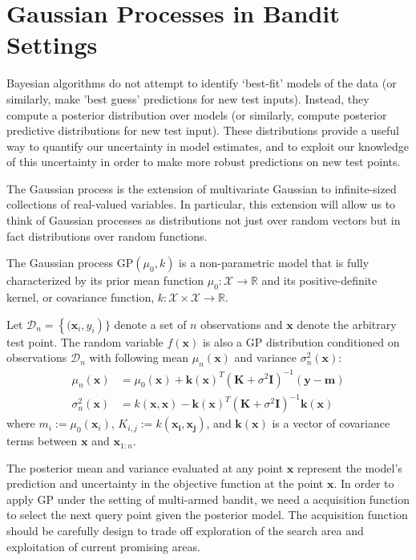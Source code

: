 \documentclass{article}
\begin{document}
\section{Gaussian Processes in Bandit Settings}
Bayesian algorithms do not attempt to identify ‘best-fit’ models of the data (or similarly, make 'best guess' predictions for new test inputs). Instead, they compute a posterior distribution over models (or similarly, compute posterior predictive distributions for new test input). These distributions provide a useful way to quantify our uncertainty in model estimates, and to exploit our knowledge of this uncertainty in order to make more robust predictions on new test points.

The Gaussian process is the extension of multivariate Gaussian to infinite-sized collections of real-valued variables. In particular, this extension will allow us to think of Gaussian processes as distributions not just over random vectors but in fact distributions over random functions.

The Gaussian process $\mathrm{GP}(\mu_0,k)$ is a non-parametric model
that is fully characterized by its prior mean function $\mu_0 :
\mathcal{X}\rightarrow \mathbb{R}$ and its positive-definite kernel,
or covariance function, $k: \mathcal{X} \times \mathcal{X} \rightarrow
\mathbb{R}$.

Let $\mathcal{D}_n = \left \{( \mathbf{x}_i, y_i \right )\}$ denote a
set of $n$ observations and $\mathbf{x}$ denote the arbitrary test
point. The random variable $f(\mathbf{x})$ is also a GP distribution
conditioned on observations $\mathcal{D}_n$ with following mean
$\mu_n(\mathbf{x})$ and variance $\sigma_n^2(\mathbf{x})$:
\begin{align}
 \mu_n(\mathbf{x}) &= \mu_0(\mathbf{x}) +
                     \mathbf{k}(\mathbf{x})^T(\mathbf{K}+\sigma^2\mathbf{I})^{-1}(\mathbf{y}-\mathbf{m})
  \\
  \sigma_n^2(\mathbf{x}) &= k(\mathbf{x}, \mathbf{x}) -
                           \mathbf{k}(\mathbf{x})^T(\mathbf{K}+\sigma^2\mathbf{I})^{-1}\mathbf{k}(\mathbf{x})
\end{align}
where $m_i := \mu_0(\mathbf{x}_i)$, $K_{i,j} := k(\mathbf{x_i, x_j})$,
and $\mathbf{k}(\mathbf{x})$ is a vector of covariance terms between
$\mathbf{x}$ and $\mathbf{x}_{1:n}$.

The posterior mean and variance evaluated at any point $\mathbf{x}$
represent the model's prediction and uncertainty in the objective
function at the point $\mathbf{x}$. In order to apply GP under the
setting of multi-armed bandit, we need a acquisition function to select
the next query point given the posterior model. The acquisition
function should be carefully design to trade off exploration of the
search area and exploitation of current promising areas.
\end{document}
